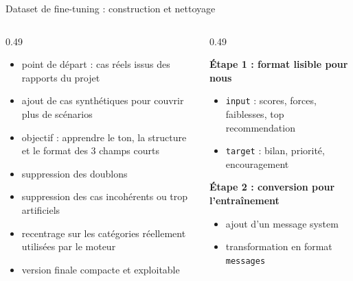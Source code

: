 ﻿\documentclass[10pt,aspectratio=169]{beamer}
\begin{document}
\begin{frame}{Dataset de fine-tuning : construction et nettoyage}
\vspace{-0.35cm}

\begin{columns}[T]
\begin{column}{0.49\textwidth}
\begin{tcolorbox}[title=Comment le dataset a été construit, colframe=primary, colback=primary!3]
\small
\begin{itemize}
    \item point de départ : cas réels issus des rapports du projet
    \item ajout de cas synthétiques pour couvrir plus de scénarios
    \item objectif : apprendre le ton, la structure et le format des 3 champs courts
\end{itemize}
\end{tcolorbox}
\begin{tcolorbox}[title=Nettoyage réalisé, colframe=warning!60!black, colback=warning!8]
\small
\begin{itemize}
    \item suppression des doublons
    \item suppression des cas incohérents ou trop artificiels
    \item recentrage sur les catégories réellement utilisées par le moteur
    \item version finale compacte et exploitable
\end{itemize}
\end{tcolorbox}
\end{column}
\begin{column}{0.49\textwidth}
\begin{tcolorbox}[title=Structure des données, colframe=success, colback=success!4]
\small
\textbf{Étape 1 : format lisible pour nous}
\begin{itemize}
    \item \texttt{input} : scores, forces, faiblesses, top recommendation
    \item \texttt{target} : bilan, priorité, encouragement
\end{itemize}
\vspace{0.15cm}
\textbf{Étape 2 : conversion pour l'entraînement}
\begin{itemize}
    \item ajout d'un message system
    \item transformation en format \texttt{messages}

\end{itemize}
\end{tcolorbox}
\end{column}
\end{columns}
\end{frame}
\end{document}
